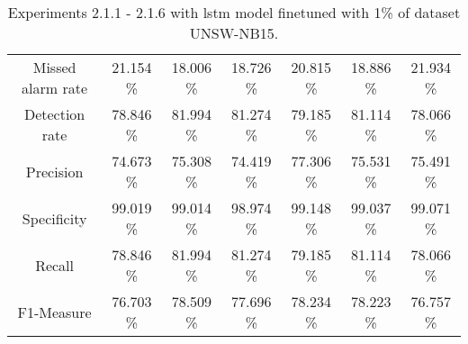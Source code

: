 \begin{table}[htb]
\begin{tabular}{@{}ccccccc@{}}
        Missed alarm rate &  21.154 \% &  18.006 \% &  18.726 \% &  20.815 \% &  18.886 \% &  21.934 \% \\
        Detection rate &  78.846 \% &  81.994 \% &  81.274 \% &  79.185 \% &  81.114 \% &  78.066 \% \\
        Precision &  74.673 \% &  75.308 \% &  74.419 \% &  77.306 \% &  75.531 \% &  75.491 \% \\
        Specificity &  99.019 \% &  99.014 \% &  98.974 \% &  99.148 \% &  99.037 \% &  99.071 \% \\
        Recall &  78.846 \% &  81.994 \% &  81.274 \% &  79.185 \% &  81.114 \% &  78.066 \% \\
        F1-Measure &  76.703 \% &  78.509 \% &  77.696 \% &  78.234 \% &  78.223 \% &  76.757 \% \\
        \bottomrule
    \end{tabular}
    \caption{Experiments 2.1.1 - 2.1.6 with \gls{lstm} model finetuned with 1\% of dataset UNSW-NB15.}
    \label{table:results:lstm:flows15_10}
\end{table}